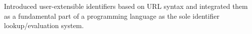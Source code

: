 \documentclass[preprint,authoryear]{acm_proc_article-sp}
\begin{document}
Introduced user-extensible identifiers based on URL syntax and 
integrated them as a fundamental part of a programming language
as the sole identifier lookup/evaluation system.












\balancecolumns
\end{document}
